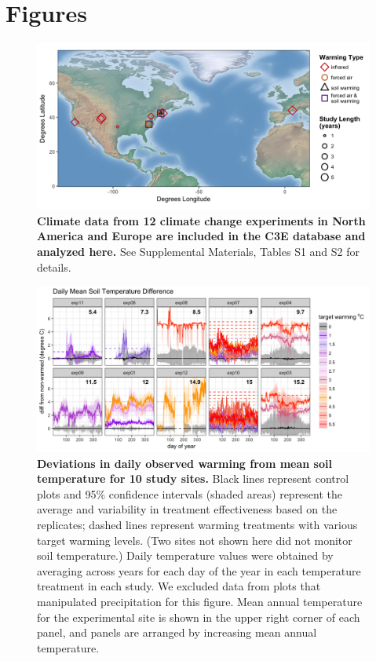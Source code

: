 \documentclass{article}
\begin{document}
\section* {Figures}
\begin{figure}[p]
\centering
\includegraphics{../Analyses/maps/RadcliffeLocations_Experiments_Open.png} 
\caption{\textbf{Climate data from 12 climate change experiments in North America and Europe are included in the C3E database and analyzed here.} See Supplemental Materials, Tables S1 and S2 for details.} 
 \label{fig:map}
 \end{figure}
\clearpage
\begin{figure}[h]
\centering
 \includegraphics{../Analyses/figures/WarmingEffects_TimeSeries_SoilTemp1Mean_Deviation_NoPrecip.png}
 \caption{\textbf{Deviations in daily observed warming from mean soil temperature for 10 study sites.} Black lines represent control plots and 95\% confidence intervals (shaded areas) represent the average and variability in treatment effectiveness based on the replicates; dashed lines represent warming treatments with various target warming levels. (Two sites not shown here did not monitor soil temperature.) %
Daily temperature values were obtained by averaging across years for each day of the year in each temperature treatment in each study. We excluded data from plots that manipulated precipitation for this figure. Mean annual temperature for the experimental site is shown in the upper right corner of each panel, and panels are arranged by increasing mean annual temperature.}
 \label{fig:effwarm}

 \end{figure}
\end{document}

